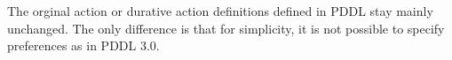 \documentclass[letterpaper]{article} %
\begin{document}
%
%
The orginal action or durative action definitions defined in PDDL stay mainly unchanged. The only difference is that for simplicity, it is not possible to specify preferences as in PDDL 3.0.



%
%



%
%

\end{document}
